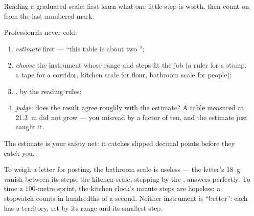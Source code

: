 \begin{omfigure}

{\small Reading a graduated scale: first learn what one little step
is worth, then count on from the last numbered mark.}
\end{omfigure}

\begin{method}\label{met:g6:measurement-in-science:estimate}
Professionals never  cold:
\begin{enumerate}
  \item \emph{estimate} first --- ``this table is about two
        '';
  \item \emph{choose} the instrument whose range and steps fit the
        job (a ruler for a stamp, a tape for a corridor, kitchen
        scale for flour, bathroom scale for people);
  \item \emph{}, by the reading rules;
  \item \emph{judge}: does the result agree roughly with the
        estimate? A table measured at \qty{21.3}{m} did not grow
        --- you misread by a factor of ten, and the estimate just
        caught it.
\end{enumerate}
The estimate is your safety net: it catches slipped decimal points
before they catch you.
\end{method}

\begin{example}\label{ex:g6:measurement-in-science:choose}
To weigh a letter for posting, the bathroom scale is useless ---
the letter's \qty{18}{g} vanish between its steps; the kitchen
scale, stepping by the , answers perfectly. To time a
$100$-metre sprint, the kitchen clock's minute steps are hopeless;
a stopwatch counts in hundredths of a second. Neither instrument
is ``better'': each has a territory, set by its range and its
smallest step.
\end{example}

